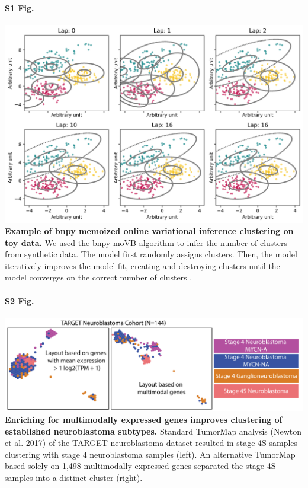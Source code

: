 \documentclass[10pt,letterpaper]{article}
\begin{document}
\paragraph*{S1 Fig.}
\includegraphics[width=\textwidth]{img/PNG/cluster-over-time}
\label{S1_Fig}
{\bf Example of bnpy memoized online variational inference clustering on toy data.} We used the bnpy moVB algorithm to infer the number of clusters from synthetic data. The model first randomly assigns clusters. Then, the model iteratively improves the model fit, creating and destroying clusters until the model converges on the correct number of clusters \cite{hughesBnpyReliableScalable}. 

\paragraph*{S2 Fig.}
\includegraphics[width=\textwidth]{img/PNG/TumorMap-NBL-MM-V3-2x}
\label{S2_Fig}
{\bf Enriching for multimodally expressed genes improves clustering of established neuroblastoma subtypes.} Standard TumorMap analysis (Newton et al. 2017) of the TARGET neuroblastoma dataset resulted in stage 4S samples clustering with stage 4 neuroblastoma samples (left). An alternative TumorMap based solely on 1,498 multimodally expressed genes separated the stage 4S samples into a distinct cluster (right).
\end{document}
